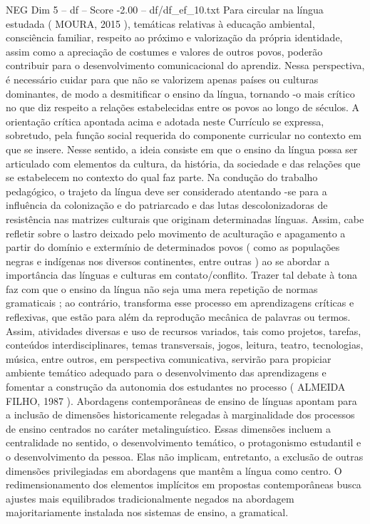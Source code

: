 \begin{textsample}{NEG Dim 5 – df – Score -2.00 – df/df\_ef\_10.txt}
Para circular na língua estudada ( MOURA, 2015 ), temáticas relativas à educação ambiental, consciência familiar, respeito ao próximo e valorização da própria identidade, assim como a apreciação de costumes e valores de outros povos, poderão contribuir para o desenvolvimento comunicacional do aprendiz.
Nessa perspectiva, é necessário cuidar para que não se valorizem apenas países ou culturas dominantes, de modo a desmitificar o ensino da língua, tornando -o mais crítico no que diz respeito a relações estabelecidas entre os povos ao longo de séculos.
A orientação crítica apontada acima e adotada neste Currículo se expressa, sobretudo, pela função social requerida do componente curricular no contexto em que se insere.
Nesse sentido, a ideia consiste em que o ensino da língua possa ser articulado com elementos da cultura, da história, da sociedade e das relações que se estabelecem no contexto do qual faz parte.
Na condução do trabalho pedagógico, o trajeto da língua deve ser considerado atentando -se para a influência da colonização e do patriarcado e das lutas descolonizadoras de resistência nas matrizes culturais que originam determinadas línguas.
Assim, cabe refletir sobre o lastro deixado pelo movimento de aculturação e apagamento a partir do domínio e extermínio de determinados povos ( como as populações negras e indígenas nos diversos continentes, entre outras ) ao se abordar a importância das línguas e culturas em contato/conflito.
Trazer tal debate à tona faz com que o ensino da língua não seja uma mera repetição de normas gramaticais ; ao contrário, transforma esse processo em aprendizagens críticas e reflexivas, que estão para além da reprodução mecânica de palavras ou termos.
Assim, atividades diversas e uso de recursos variados, tais como projetos, tarefas, conteúdos interdisciplinares, temas transversais, jogos, leitura, teatro, tecnologias, música, entre outros, em perspectiva comunicativa, servirão para propiciar ambiente temático adequado para o desenvolvimento das aprendizagens e fomentar a construção da autonomia dos estudantes no processo ( ALMEIDA FILHO, 1987 ).
Abordagens contemporâneas de ensino de línguas apontam para a inclusão de dimensões historicamente relegadas à marginalidade dos processos de ensino centrados no caráter metalinguístico.
Essas dimensões incluem a centralidade no sentido, o desenvolvimento temático, o protagonismo estudantil e o desenvolvimento da pessoa.
Elas não implicam, entretanto, a exclusão de outras dimensões privilegiadas em abordagens que mantêm a língua como centro.
O redimensionamento dos elementos implícitos em propostas contemporâneas busca ajustes mais equilibrados tradicionalmente negados na abordagem majoritariamente instalada nos sistemas de ensino, a gramatical.

\end{textsample}

